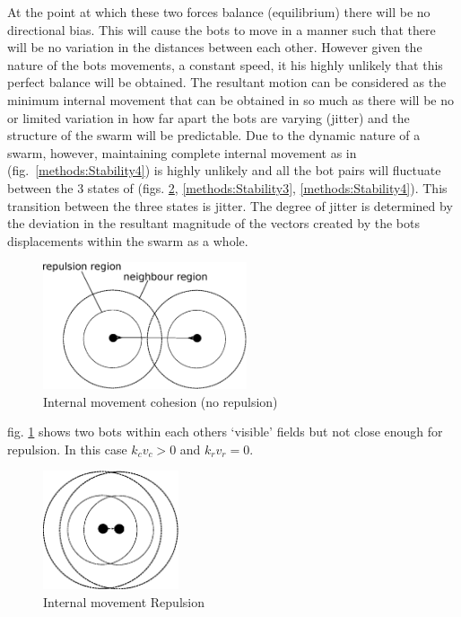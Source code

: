 \documentclass[10pt,journal,letterpaper,twoside]{IEEEtran}
\newcommand{\stability}{internal movement}
\newcommand{\Stability}{Internal movement}
\newcommand{\Fig}{fig.}
\newcommand{\Figs}{figs.}
\begin{document}
At the point at which these two forces balance (equilibrium) there
will be no directional bias. This will cause the bots to move in a
manner such that there will be no variation in the distances between
each other. However given the nature of the bots movements, a constant
speed, it his highly unlikely that this perfect balance will be
obtained. The resultant motion can be considered as the minimum
\stability{} that can be obtained in so much as there will be no or
limited variation in how far apart the bots are varying (jitter) and
the structure of the swarm will be predictable. Due to the dynamic
nature of a swarm, however, maintaining complete \stability{} as in
(\Fig{}~\ref{methods:Stability4}) is highly unlikely and all the bot
pairs will fluctuate between the 3 states of (\Figs{}
\ref{methods:Stability2}, \ref{methods:Stability3},
\ref{methods:Stability4}).  This transition between the three states
is jitter. The degree of jitter is determined by the deviation in the
resultant magnitude of the vectors created by the bots displacements
within the swarm as a whole.

\begin{figure}[H]
\begin{center}
\includegraphics[width=6cm]{figures/Stability1}
\end{center}
\caption{\Stability{} cohesion (no repulsion)} \label{methods:Stability1}
\end{figure}

\Fig{} \ref{methods:Stability1} shows two bots within each others
`visible' fields but not close enough for repulsion.  In this case
$k_cv_c > 0$ and $k_rv_r = 0$.

\begin{figure}[H]
\begin{center}
\includegraphics[width=4cm]{figures/Stability2}
\end{center}
\caption{\Stability{} Repulsion} \label{methods:Stability2}
\end{figure}
\end{document}
